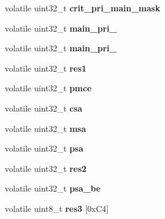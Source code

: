 \begin{DoxyCompactItemize}
\item 
\mbox{\label{structmpc5200___a4ca944019611687d536f7fe8ecae5102}} 
volatile uint32\+\_\+t {\bfseries crit\+\_\+pri\+\_\+main\+\_\+mask}
\item 
\mbox{\label{structmpc5200___a49392f8223f52060dc3b70a1b9cb6a74}} 
volatile uint32\+\_\+t {\bfseries main\+\_\+pri\+\_}
\item 
\mbox{\label{structmpc5200___af9344004ff295b9bef1bc86e388260c6}} 
volatile uint32\+\_\+t {\bfseries main\+\_\+pri\+\_}
\item 
\mbox{\label{structmpc5200___a7bf7f3d303b08aba4be68c04c0da7e1e}} 
volatile uint32\+\_\+t {\bfseries res1}
\item 
\mbox{\label{structmpc5200___abd82abef6d07bb323a5bef1cb8b2c204}} 
volatile uint32\+\_\+t {\bfseries pmce}
\item 
\mbox{\label{structmpc5200___a3206dea8be1d614521051a0f5ae99927}} 
volatile uint32\+\_\+t {\bfseries csa}
\item 
\mbox{\label{structmpc5200___adc9022c74a5cf6b8e26996a15e021a78}} 
volatile uint32\+\_\+t {\bfseries msa}
\item 
\mbox{\label{structmpc5200___a8e0747ed80df271d60c171ea5a7708bd}} 
volatile uint32\+\_\+t {\bfseries psa}
\item 
\mbox{\label{structmpc5200___af17386ff62d91fa2f1645081ab2d9324}} 
volatile uint32\+\_\+t {\bfseries res2}
\item 
\mbox{\label{structmpc5200___aa292887ede393e1bfb9ac426900c5320}} 
volatile uint32\+\_\+t {\bfseries psa\+\_\+be}
\item 
\mbox{\label{structmpc5200___ac82a067107190dcc4064580b7648e756}} 
volatile uint8\+\_\+t {\bfseries res3} \mbox{[}0x\+C4\mbox{]}
\item 
\mbox{\label{structmpc5200___a3ed386b935e8eb19205fceab5a529e1d}} 

\end{DoxyCompactItemize}
